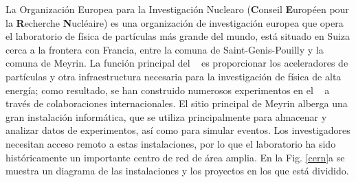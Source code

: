 La Organización Europea para la Investigación Nuclearo \CERN (\textbf{C}onseil \textbf{E}uropéen pour la \textbf{R}echerche \textbf{N}ucléaire) es una organización de investigación europea que opera el laboratorio de física de partículas más grande del mundo, está situado en Suiza cerca a la frontera con Francia, entre la comuna de Saint-Genis-Pouilly y la comuna de Meyrin. La función principal del \CERN ~ es proporcionar los aceleradores de partículas y otra infraestructura necesaria para la investigación de física de alta energía; como resultado, se han construido numerosos experimentos en el \CERN ~ a través de colaboraciones internacionales. El sitio principal de Meyrin alberga una gran instalación informática, que se utiliza principalmente para almacenar y analizar datos de experimentos, así como para simular eventos. Los investigadores necesitan acceso remoto a estas instalaciones, por lo que el laboratorio ha sido históricamente un importante centro de red de área amplia. En la Fig. \ref{cern}a se muestra un diagrama de las instalaciones y los proyectos en los que está dividido. 

